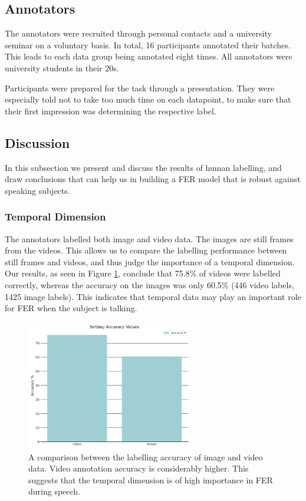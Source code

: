 \subsection{Annotators}
The annotators were recruited through personal contacts and a university seminar on a voluntary basis. In total, 16 participants annotated their batches. This leads to each data group being annotated eight times. All annotators were university students in their 20s.

Participants were prepared for the task through a presentation. They were especially told not to take too much time on each datapoint, to make sure that their first impression was determining the respective label.

\subsection{Discussion}
In this subsection we present and discuss the results of human labelling, and draw conclusions that can help us in building a FER model that is robust against speaking subjects.

\subsubsection{Temporal Dimension}
The annotators labelled both image and video data. The images are still frames from the videos. This allows us to compare the labelling performance between still frames and videos, and thus judge the importance of a temporal dimension. Our results, as seen in Figure \ref{fig:setting_overview}, conclude that 75.8\% of videos were labelled correctly, whereas the accuracy on the images was only 60.5\% (446 video labels, 1425 image labels). This indicates that temporal data may play an important role for FER when the subject is talking.


\begin{figure}
    \centering
    \includegraphics[width=0.65\textwidth]{res/Setting_overview.png}
    \caption{A comparison between the labelling accuracy of image and video data. Video annotation accuracy is considerably higher. This suggests that the temporal dimension is of high importance in FER during speech.}
    \label{fig:setting_overview}
\end{figure}

